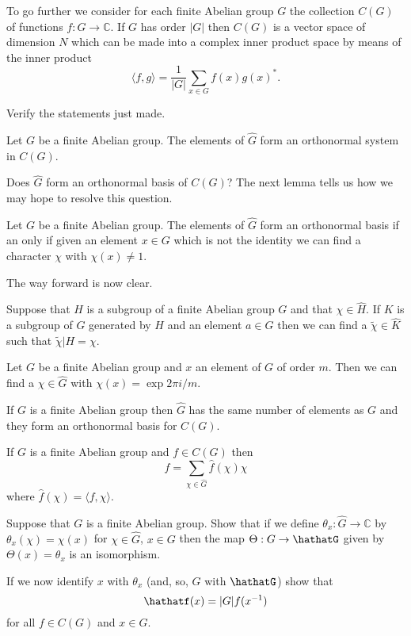 To go further we consider for each finite Abelian group
$G$ the collection $C(G)$ of functions $f:G\rightarrow{\mathbb C}$.
If $G$ has order $|G|$ then $C(G)$ is a vector space of 
dimension $N$ which can be made into a  complex inner
product space by means of the inner product
\[\langle f,g\rangle=\frac{1}{|G|}\sum_{x\in G}f(x)g(x)^{*}.\]
\begin{exercise} Verify the statements just made.
\end{exercise}

\begin{lemma} Let $G$ be a finite Abelian group.
The elements of $\hat{G}$ form an orthonormal
system in  $C(G)$.
\end{lemma}
Does $\hat{G}$ form an orthonormal basis of $C(G)$? The
next lemma tells us how we may hope to resolve this
question.
\begin{lemma} Let $G$ be a finite Abelian group.
The elements of $\hat{G}$  form an orthonormal basis
if an only if given an element $x\in G$ which is
not the identity we can find a character $\chi$
with $\chi(x)\neq 1$.
\end{lemma}

The way forward is now clear.
\begin{lemma} 
Suppose that $H$ is a subgroup of a finite Abelian
group  $G$ and that $\chi\in\hat{H}$. If $K$
is a subgroup of $G$ generated by $H$ and an element
$a\in G$ then we can find a $\tilde{\chi}\in\hat{K}$
such that $\tilde{\chi}|H=\chi$.
\end{lemma}
\begin{lemma} Let $G$ be a finite Abelian group
and $x$ an element of $G$ of order $m$. Then
we can find a $\chi\in\hat{G}$ with
$\chi(x)=\exp 2\pi i/m$.
\end{lemma}
\begin{theorem} If $G$ is a finite Abelian group
then $\hat{G}$ has the same number of elements
as $G$ and they form an orthonormal basis
for $C(G)$.
\end{theorem}
\begin{lemma} If $G$ is a finite Abelian group
and $f\in C(G)$ then
\[f=\sum_{\chi\in\hat{G}}\hat{f}(\chi)\chi\]
where $\hat{f}(\chi)=\langle f,\chi \rangle$.
\end{lemma}
\begin{exercise} Suppose that $G$ is a finite Abelian
group. Show that if we define 
$\theta_{x}:\hat{G}\rightarrow {\mathbb C}$ by
$\theta_{x}(\chi)=\chi(x)$ for $\chi\in \hat{G}$,
$x\in G$ then the map $\Theta:G\rightarrow\hathatG$
given by $\Theta(x)=\theta_{x}$ is an isomorphism.

If we now identify $x$ with $\theta_{x}$ (and, so,
$G$ with $\hathatG$) show that
\[\hathatf(x)=|G|f(x^{-1})\]
for all $f\in C(G)$ and $x\in G$.
\end{exercise}     

